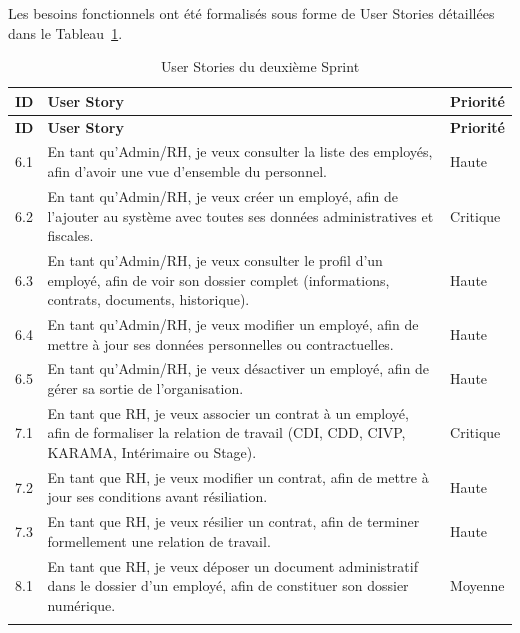 Les besoins fonctionnels ont été formalisés sous forme de User Stories
détaillées dans le Tableau~\ref{tab:user-stories-sprint2}.
\renewcommand{\arraystretch}{1.4}
\begin{small}
\begin{longtable}{|p{1.2cm}|p{9.5cm}|p{2.3cm}|}

\hline
\rowcolor[gray]{0.9}
\textbf{ID} & \textbf{User Story} & \textbf{Priorité} \\
\hline
\endfirsthead

\hline
\rowcolor[gray]{0.9}
\textbf{ID} & \textbf{User Story} & \textbf{Priorité} \\
\hline
\endhead

\hline
\endfoot
\endfoot

6.1 & En tant qu'Admin/RH, je veux consulter la liste des employés,
      afin d'avoir une vue d'ensemble du personnel.
    & Haute \\ \hline

6.2 & En tant qu'Admin/RH, je veux créer un employé, afin de l'ajouter
      au système avec toutes ses données administratives et fiscales.
    & Critique \\ \hline

6.3 & En tant qu'Admin/RH, je veux consulter le profil d'un employé,
      afin de voir son dossier complet (informations, contrats,
      documents, historique).
    & Haute \\ \hline

6.4 & En tant qu'Admin/RH, je veux modifier un employé, afin de mettre
      à jour ses données personnelles ou contractuelles.
    & Haute \\ \hline

6.5 & En tant qu'Admin/RH, je veux désactiver un employé, afin de
      gérer sa sortie de l'organisation.
    & Haute \\ \hline

7.1 & En tant que RH, je veux associer un contrat à un employé, afin
      de formaliser la relation de travail (CDI, CDD, CIVP, KARAMA,
      Intérimaire ou Stage).
    & Critique \\ \hline

7.2 & En tant que RH, je veux modifier un contrat, afin de mettre à
      jour ses conditions avant résiliation.
    & Haute \\ \hline

7.3 & En tant que RH, je veux résilier un contrat, afin de terminer
      formellement une relation de travail.
    & Haute \\ \hline

8.1 & En tant que RH, je veux déposer un document administratif dans
      le dossier d'un employé, afin de constituer son dossier numérique.
    & Moyenne \\ \hline
\caption{User Stories du deuxième Sprint}   
\label{tab:user-stories-sprint2}    
\end{longtable}
\end{small}
\renewcommand{\arraystretch}{1.0}

